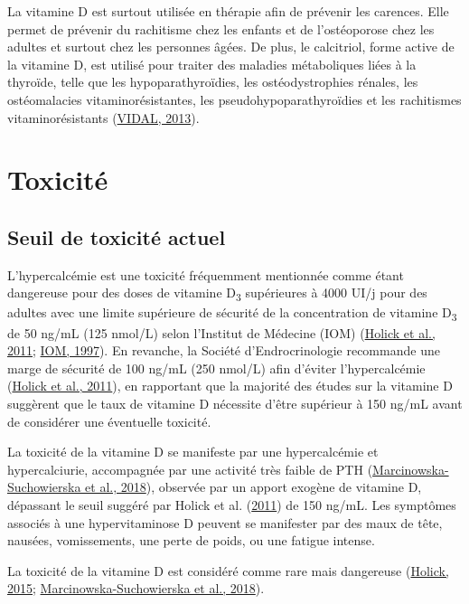 \documentclass[
  a4paper,
  DIV=11,
  numbers=noendperiod,
  listof=totoc]{scrreprt}
\begin{document}
La vitamine D est surtout utilisée en thérapie afin de prévenir les
carences. Elle permet de prévenir du rachitisme chez les enfants et de
l'ostéoporose chez les adultes et surtout chez les personnes âgées. De
plus, le calcitriol, forme active de la vitamine D, est utilisé pour
traiter des maladies métaboliques liées à la thyroïde, telle que les
hypoparathyroïdies, les ostéodystrophies rénales, les ostéomalacies
vitaminorésistantes, les pseudohypoparathyroïdies et les rachitismes
vitaminorésistants (\protect\hyperlink{ref-VIDAL.2013}{VIDAL, 2013}).

\hypertarget{toxicituxe9}{%
\section{Toxicité}\label{toxicituxe9}}

\hypertarget{seuil-de-toxicituxe9-actuel}{%
\subsection{Seuil de toxicité
actuel}\label{seuil-de-toxicituxe9-actuel}}

L'hypercalcémie est une toxicité fréquemment mentionnée comme étant
dangereuse pour des doses de vitamine D\textsubscript{3} supérieures à
4000 UI/j pour des adultes avec une limite supérieure de sécurité de la
concentration de vitamine D\textsubscript{3} de 50 ng/mL (125 nmol/L)
selon l'Institut de Médecine (IOM)
(\protect\hyperlink{ref-Holick.2011}{Holick et al., 2011};
\protect\hyperlink{ref-IOM.1997}{IOM, 1997}). En revanche, la Société
d'Endrocrinologie recommande une marge de sécurité de 100 ng/mL (250
nmol/L) afin d'éviter l'hypercalcémie
(\protect\hyperlink{ref-Holick.2011}{Holick et al., 2011}), en
rapportant que la majorité des études sur la vitamine D suggèrent que le
taux de vitamine D nécessite d'être supérieur à 150 ng/mL avant de
considérer une éventuelle toxicité.

La toxicité de la vitamine D se manifeste par une hypercalcémie et
hypercalciurie, accompagnée par une activité très faible de PTH
(\protect\hyperlink{ref-Marcinowska-Suchowierska.2018}{Marcinowska-Suchowierska
et al., 2018}), observée par un apport exogène de vitamine D, dépassant
le seuil suggéré par Holick et al.
(\protect\hyperlink{ref-Holick.2011}{2011}) de 150 ng/mL. Les symptômes
associés à une hypervitaminose D peuvent se manifester par des maux de
tête, nausées, vomissements, une perte de poids, ou une fatigue intense.

La toxicité de la vitamine D est considéré comme rare mais dangereuse
(\protect\hyperlink{ref-Holick.2015}{Holick, 2015};
\protect\hyperlink{ref-Marcinowska-Suchowierska.2018}{Marcinowska-Suchowierska
et al., 2018}).
\end{document}

